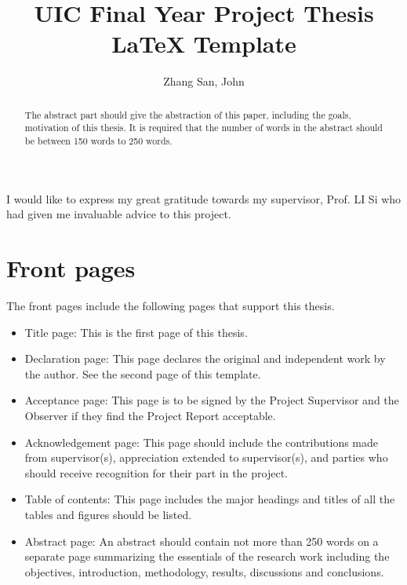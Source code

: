 \documentclass[12pt]{article}
\title{UIC Final Year Project Thesis \LaTeX{} Template}
\author{Zhang San, John}
\begin{document}

\maketitle
\thispagestyle{empty}
\newpage
\clearpage{}
\setcounter{page}{2}

\newpage

\begin{acknowledgement}
    I would like to express my great gratitude towards my supervisor, Prof. LI Si who had given me invaluable advice to this project.
\end{acknowledgement}

\clearpage{}
\newpage
\clearpage{}
\setcounter{page}{1} %
\maketitle
\thispagestyle{empty}
\newpage
{}
\begin{abstract}
    The abstract part should give the abstraction of this paper, including the goals, motivation of this thesis. It is required that the number of words in the abstract should be between 150 words to 250 words.
\end{abstract}
\newpage
\tableofcontents{}
\newpage
\section{Front pages}
The front pages include the following pages that support this thesis. 
\begin{itemize}
    \item Title page: This is the first page of this thesis.
    \item Declaration page: This page declares the original and independent work by the author. See the second page of this template.
    \item Acceptance page: This page is to be signed by the Project Supervisor and the Observer if they find the Project Report acceptable. 
    \item Acknowledgement page: This page should include the contributions made from supervisor(s), appreciation extended to supervisor(s), and parties who should receive recognition for their part in the project. 
    \item Table of contents: This page includes the major headings and titles of all the tables and figures should be listed. 
    \item Abstract page: An abstract should contain not more than 250 words on a separate page summarizing the essentials of the research work including the objectives, introduction, methodology, results, discussions and conclusions. 
\end{itemize}
\end{document}
